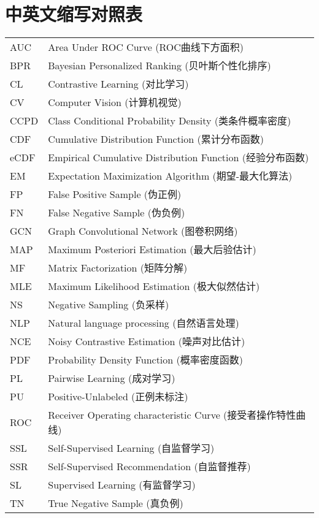 \chapter{中英文缩写对照表}
\begin{center} \xiaosi
\vspace{0.2cm}
\renewcommand{\arraystretch}{1.4}
\begin{longtable}{p{4cm}l}
AUC&Area Under ROC Curve (ROC曲线下方面积)  \\
BPR&Bayesian Personalized Ranking (贝叶斯个性化排序)\\
CL&Contrastive Learning (对比学习) \\
CV&Computer Vision (计算机视觉) \\
CCPD&Class Conditional Probability Density (类条件概率密度) \\
CDF&Cumulative Distribution Function (累计分布函数) \\
eCDF&Empirical Cumulative Distribution Function (经验分布函数) \\
EM & Expectation Maximization Algorithm (期望-最大化算法)\\
FP&False Positive Sample (伪正例) \\
FN&False Negative Sample (伪负例) \\
GCN&Graph Convolutional Network (图卷积网络)\\
MAP& Maximum Posteriori Estimation (最大后验估计) \\
MF&Matrix Factorization  (矩阵分解)\\
MLE&Maximum Likelihood Estimation (极大似然估计) \\
NS&Negative Sampling (负采样) \\
NLP&Natural language processing (自然语言处理)\\
NCE&Noisy Contrastive Estimation (噪声对比估计) \\
PDF&Probability Density Function  (概率密度函数)\\
PL&Pairwise Learning  (成对学习)\\
PU&Positive-Unlabeled (正例未标注) \\
ROC&Receiver Operating characteristic Curve (接受者操作特性曲线)  \\
SSL&Self-Supervised Learning (自监督学习)  \\
SSR&Self-Supervised Recommendation (自监督推荐)  \\
SL&Supervised Learning  (有监督学习)\\
TN&True Negative Sample (真负例) 
\end{longtable}
\end{center}  